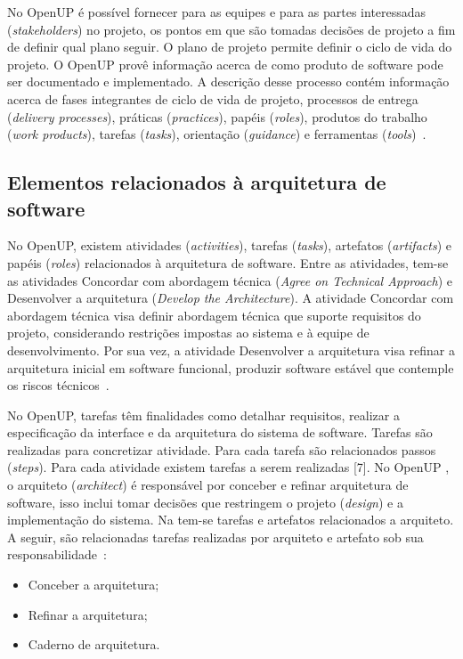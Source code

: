 No OpenUP é possível fornecer para as equipes e para as partes interessadas (\emph{stakeholders}) no projeto, os pontos em que são tomadas decisões de projeto a fim de definir qual plano seguir. O plano de projeto permite definir o ciclo de vida do projeto. O OpenUP provê informação acerca de como produto de software pode ser documentado e implementado. A descrição desse processo contém informação acerca de fases integrantes de ciclo de vida de projeto, processos de entrega (\emph{delivery processes}), práticas (\emph{practices}), papéis (\emph{roles}), produtos do trabalho (\emph{work products}), tarefas (\emph{tasks}), orientação (\emph{guidance}) e ferramentas (\emph{tools})~\cite{openup}.

\subsection{Elementos relacionados à arquitetura de software}
\label{sec:5.1.1}

No OpenUP, existem atividades (\emph{activities}), tarefas (\emph{tasks}), artefatos (\emph{artifacts}) e papéis (\emph{roles}) relacionados à arquitetura de software. Entre as atividades, tem-se as atividades Concordar com abordagem técnica (\emph{Agree on Technical Approach}) e Desenvolver a arquitetura (\emph{Develop the Architecture}). A atividade Concordar com  abordagem técnica visa definir abordagem técnica que suporte requisitos do projeto, considerando restrições impostas ao sistema e à equipe de desenvolvimento. Por sua vez, a atividade Desenvolver a arquitetura visa refinar a arquitetura inicial em software funcional, produzir software estável que contemple os riscos técnicos~\cite{openup}.

No OpenUP, tarefas têm finalidades como detalhar requisitos, realizar a especificação da interface e da arquitetura do sistema de software. Tarefas são realizadas para concretizar atividade. Para cada tarefa são relacionados passos (\emph{steps}). Para cada atividade existem tarefas a serem realizadas [7]. No OpenUP , o arquiteto (\emph{architect}) é responsável por conceber e refinar arquitetura de software, isso inclui tomar decisões que restringem o projeto (\emph{design}) e a implementação do sistema. Na  tem-se tarefas e artefatos relacionados a arquiteto. A seguir, são relacionadas tarefas realizadas por arquiteto e artefato sob sua responsabilidade~\cite{openup}: 

\begin{itemize}
    \item Conceber a arquitetura;
    \item Refinar a arquitetura;
    \item Caderno de arquitetura.
\end{itemize} 


